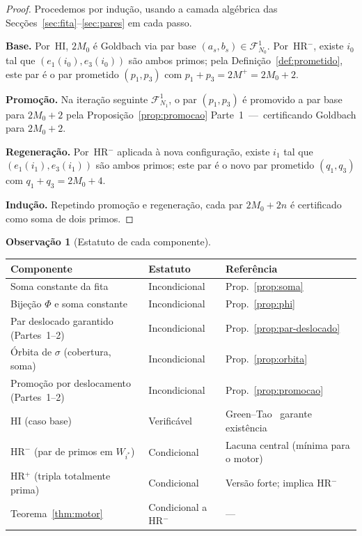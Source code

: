 \documentclass[12pt, a4paper]{article}
\theoremstyle{plain}
\theoremstyle{definition}
\newtheorem{remark}[theorem]{Observação}
\theoremstyle{remark}
\begin{document}
	\begin{proof}
		Procedemos por indução, usando a camada algébrica das
		Secções~\ref{sec:fita}--\ref{sec:pares} em cada passo.
		
		\textbf{Base.}  Por~HI, $2M_0$ é Goldbach via par base
		$(a_s,b_s)\in\mathcal{F}_{N_0}^1$.  Por~HR$^-$, existe $i_0$
		tal que $(e_1(i_0),e_3(i_0))$ são ambos primos; pela
		Definição~\ref{def:prometido}, este par é o par prometido
		$(p_1,p_3)$ com $p_1+p_3=2M^+=2M_0+2$.
		
		\textbf{Promoção.}  Na iteração seguinte $\mathcal{F}_{N_1}^1$,
		o par $(p_1,p_3)$ é promovido a par base para $2M_0+2$
		pela Proposição~\ref{prop:promocao} Parte~1~---~certificando
		Goldbach para $2M_0+2$.
		
		\textbf{Regeneração.}  Por~HR$^-$ aplicada à nova configuração,
		existe $i_1$ tal que $(e_1(i_1),e_3(i_1))$ são ambos primos;
		este par é o novo par prometido $(q_1,q_3)$ com
		$q_1+q_3=2M_0+4$.
		
		\textbf{Indução.}  Repetindo promoção e regeneração, cada par
		$2M_0+2n$ é certificado como soma de dois primos.
	\end{proof}
	
	\begin{remark}[Estatuto de cada componente]
		\label{rem:estatuto}
		\begin{center}
			\begin{tabular}{lll}
				\toprule
				Componente & Estatuto & Referência \\
				\midrule
				Soma constante da fita & Incondicional &
				Prop.~\ref{prop:soma} \\
				Bijeção $\Phi$ e soma constante & Incondicional &
				Prop.~\ref{prop:phi} \\
				Par deslocado garantido (Partes~1--2) & Incondicional &
				Prop.~\ref{prop:par-deslocado} \\
				Órbita de $\sigma$ (cobertura, soma) & Incondicional &
				Prop.~\ref{prop:orbita} \\
				Promoção por deslocamento (Partes~1--2) & Incondicional &
				Prop.~\ref{prop:promocao} \\
				HI (caso base) & Verificável &
				Green--Tao~\cite{green-tao} garante existência \\
				HR$^-$ (par de primos em $W_{i^*}$) & Condicional &
				Lacuna central (mínima para o motor) \\
				HR$^+$ (tripla totalmente prima) & Condicional &
				Versão forte; implica HR$^-$ \\
				Teorema~\ref{thm:motor} & Condicional a HR$^-$ & --- \\
				\bottomrule
			\end{tabular}
		\end{center}
	\end{remark}
	
\end{document}

